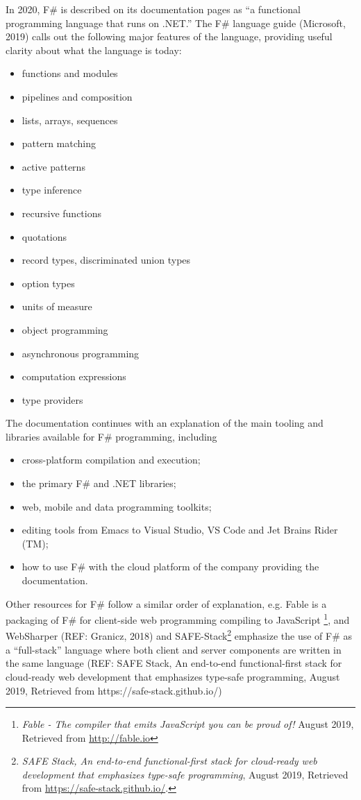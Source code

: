 \documentclass[acmsmall]{acmart}\settopmatter{}
\begin{document}
In 2020, F\# is described on its documentation pages as “a functional programming language that runs on .NET.” The F\# language guide (Microsoft, 2019) calls out the following major features of the language, providing useful clarity about what the language is today:
\begin{itemize}
\item functions and modules
\item pipelines and composition
\item lists, arrays, sequences
\item pattern matching 
\item active patterns 
\item type inference
\item recursive functions
\item quotations
\item record types, discriminated union types
\item option types
\item units of measure
\item object programming
\item asynchronous programming
\item computation expressions
\item type providers
\end{itemize}
The documentation continues with an explanation of the main tooling and libraries available for F\# programming, including
\begin{itemize}
\item cross-platform compilation and execution;
\item the primary F\# and .NET libraries;
\item web, mobile and data programming toolkits;
\item editing tools from Emacs to Visual Studio, VS Code and Jet Brains Rider (TM);
\item how to use F\# with the cloud platform of the company providing the documentation.
\end{itemize}
Other resources for F\# follow a similar order of explanation, e.g. Fable  is a packaging of F\# for client-side web
programming compiling to JavaScript \footnote{ \textit{Fable - The compiler that emits JavaScript you can be proud of!} August 2019, Retrieved from \url{http://fable.io}}, and
WebSharper (REF: Granicz, 2018) and SAFE-Stack\footnote{\textit{SAFE Stack, An end-to-end functional-first stack for
cloud-ready web development that emphasizes type-safe programming}, August 2019,  Retrieved from \url{https://safe-stack.github.io/}.} emphasize
the use of F\# as a “full-stack” language where both client and server components are written in the
same language (REF: SAFE Stack, An end-to-end functional-first stack for cloud-ready web development that emphasizes type-safe programming, August 2019,  Retrieved from https://safe-stack.github.io/)
\end{document}
